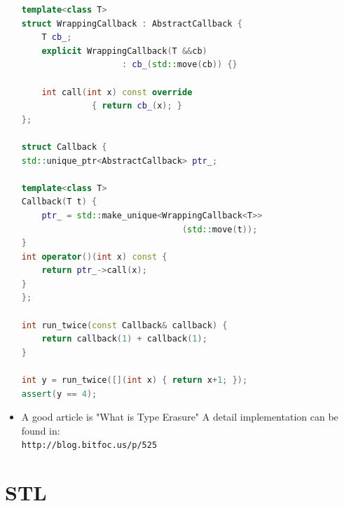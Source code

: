 \documentclass[a4paper,11pt,twoside]{book}
\begin{document}
\begin{itemize}
\begin{lstlisting}[frame=single, language=c++]
template<class T>
struct WrappingCallback : AbstractCallback {
	T cb_;
	explicit WrappingCallback(T &&cb) 
	                : cb_(std::move(cb)) {}
	                
	int call(int x) const override 
	          { return cb_(x); }
};

struct Callback {
std::unique_ptr<AbstractCallback> ptr_;

template<class T>
Callback(T t) {
	ptr_ = std::make_unique<WrappingCallback<T>>
	                            (std::move(t));
}
int operator()(int x) const {
	return ptr_->call(x);
}
};

int run_twice(const Callback& callback) {
	return callback(1) + callback(1);
}

int y = run_twice([](int x) { return x+1; });
assert(y == 4);
\end{lstlisting}
\item A good article is "What is Type Erasure" A detail implementation can be found in:\\ \verb|http://blog.bitfoc.us/p/525|
\end{itemize}



\chapter{STL}
\end{document}
